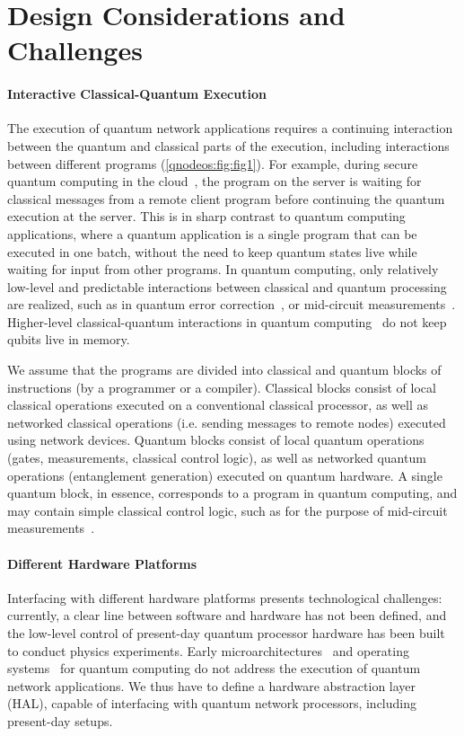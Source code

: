 \section{Design Considerations and Challenges}
\paragraph{Interactive Classical-Quantum Execution}
The execution of quantum network applications requires a continuing interaction between the quantum and classical parts of the execution, including interactions between different programs (\cref{qnodeos:fig:fig1}).
For example, during secure quantum computing in the cloud~\cite{broadbent_2009_ubqc,ma_qenclave-practical_2022}, the program on the server is waiting for classical messages from a remote client program before continuing the quantum execution at the server.
This is in sharp contrast to quantum computing applications, where a quantum application is a single program that can be executed in one batch, without the need to keep quantum states live while waiting for input from other programs.
In quantum computing, only relatively low-level and predictable interactions between classical and quantum processing are realized, such as in quantum error correction~\cite{lidar2013quantum}, or mid-circuit measurements~\cite{botelho_error_2022}.
Higher-level classical-quantum interactions in quantum computing~\cite{bharti_noisy_2022} do not keep qubits live in memory.

We assume that the programs are divided into classical and quantum blocks of instructions (by a programmer or a compiler).
Classical blocks consist of local classical operations executed on a conventional classical processor, as well as networked classical operations (i.e. sending messages to remote nodes) executed using network devices.
Quantum blocks consist of local quantum operations (gates, measurements, classical control logic), as well as networked quantum operations (entanglement generation) executed on quantum hardware.
A single quantum block, in essence, corresponds to a program in quantum computing, and may contain simple classical control logic, such as for the purpose of mid-circuit measurements~\cite{botelho_error_2022}.

\paragraph{Different Hardware Platforms}
Interfacing with different hardware platforms presents technological challenges: currently, a clear line between software and hardware has not been defined, and the low-level control of present-day quantum processor hardware has been built to conduct physics experiments.
Early microarchitectures~\cite{bertels_quantum_2020,fu_2019_eqasm} and operating systems~\cite{giortamis_qos_2024,kong_2021_origin} for quantum computing do not address the execution of quantum network applications.
We thus have to define a hardware abstraction layer (HAL), capable of interfacing with quantum network processors, including present-day setups. 

